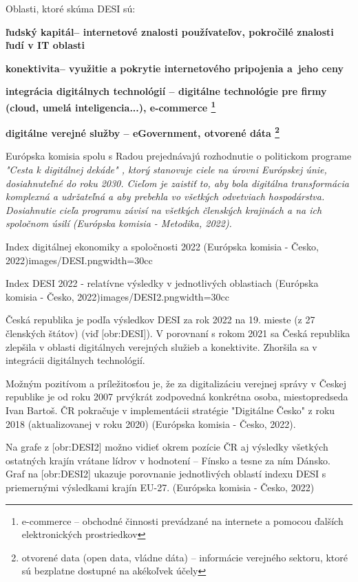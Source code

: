 \blank
Oblasti, ktoré skúma DESI sú:

\startitemize
\item{\start\bf ľudský kapitál\stop -- internetové znalosti používateľov, pokročilé znalosti ľudí v IT oblasti}
\item{\start\bf konektivita\stop -- využitie a pokrytie internetového pripojenia a~jeho ceny}
\item{\start\bf integrácia digitálnych technológií \stop -- digitálne technológie pre firmy (cloud, umelá inteligencia...), e-commerce \footnote{e-commerce -- obchodné činnosti prevádzané na internete a pomocou ďalších elektronických prostriedkov}}
\item{\start\bf digitálne verejné služby \stop -- eGovernment, otvorené dáta \footnote{otvorené data (open data, vládne dáta) -- informácie verejného sektoru, ktoré sú bezplatne dostupné na akékoľvek účely}}
\stopitemize 

Európska komisia spolu s Radou prejednávajú rozhodnutie o politickom programe \start\it "Cesta k digitálnej dekáde" \stop, ktorý stanovuje ciele na úrovni Európskej únie, dosiahnuteľné do roku 2030. Cieľom je zaistiť to, aby bola digitálna transformácia komplexná a udržateľná a aby prebehla vo všetkých odvetviach hospodárstva. Dosiahnutie cieľa programu závisí na všetkých členských krajinách a na ich spoločnom úsilí \scr(Európska komisia - Metodika, 2022).

{Index digitálnej ekonomiky a spoločnosti 2022 (Európska komisia - Česko, 2022)}{images/DESI.png}{width=30cc}

{Index DESI 2022 - relatívne výsledky v jednotlivých oblastiach (Európska komisia - Česko, 2022)}{images/DESI2.png}{width=30cc}

Česká republika je podľa výsledkov DESI za rok 2022 na 19. mieste (z 27 členských štátov) (viď [obr:DESI]). V porovnaní s rokom 2021 sa Česká republika zlepšila v oblasti digitálnych verejných služieb a konektivite. Zhoršila sa v integrácii digitálnych technológií.

Možným pozitívom a príležitosťou je, že za digitalizáciu verejnej správy v Českej republike je od roku 2007 prvýkrát zodpovedná konkrétna osoba, miestopredseda Ivan Bartoš. ČR pokračuje v implementácii stratégie "Digitálne Česko" z roku 2018 (aktualizovanej v roku 2020) \scr(Európska komisia - Česko, 2022).

Na grafe z [obr:DESI2] možno vidieť okrem pozície ČR aj výsledky všetkých ostatných krajín vrátane lídrov v hodnotení -- Fínsko a tesne za ním Dánsko. Graf na [obr:DESI2] ukazuje porovnanie jednotlivých oblastí indexu DESI s priemernými výsledkami krajín EU-27. \scr(Európska komisia - Česko, 2022)


